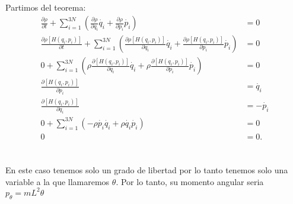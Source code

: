 \documentclass{report}
\begin{document}
\section{}

Partimos del teorema:
\begin{align*}
  \frac{\partial \rho}{\partial t} + \sum_{i=1}^{3N} \left( \frac{\partial \rho}{\partial q_i} \dot{q_i} + \frac{\partial \rho}{\partial p_i} \dot{p_i} \right) &= 0 \\
  \frac{\partial \rho\left[H(q_i,p_i)\right]}{\partial t} + \sum_{i=1}^{3N} \left( \frac{\partial \rho\left[H(q_i,p_i)\right]}{\partial q_i} \dot{q_i} + \frac{\partial \rho\left[H(q_i,p_i)\right]}{\partial p_i} \dot{p_i} \right) &= 0 \\
  0 + \sum_{i=1}^{3N} \left( \rho \frac{\partial \left[H(q_i,p_i)\right]}{\partial q_i} \dot{q_i} + \rho\frac{\partial \left[H(q_i,p_i)\right]}{\partial p_i} \dot{p_i} \right) &= 0 \\
  \frac{\partial \left[H(q_i,p_i)\right]}{\partial p_i} &=  \dot{q_i}\\
  \frac{\partial \left[H(q_i,p_i)\right]}{\partial q_i} &= - \dot{p_i}\\
  0 + \sum_{i=1}^{3N} \left( -\rho\dot{p_i} \dot{q_i} + \rho \dot{q_i} \dot{p_i} \right) &= 0 \\
  0 &= 0 
.\end{align*}

\chapter{}

\section{}

En este caso tenemos solo un grado de libertad por lo tanto tenemos solo una variable a la que llamaremos $\theta$. Por lo tanto, su momento angular seria $p_\theta = mL^2\theta$
\end{document}
